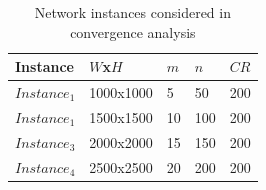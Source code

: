 \begin{table}[!ht]
\begin{center}
\caption{Network instances considered in convergence analysis}
\label{instancesH}
\begin{tabular}{|l|l|l|l|l|}
\hline
\textbf{Instance }& \textbf{$W$x$H$}&\textbf{$m$ }& \textbf{$n$}&\textbf{$CR$}\\\hline
$Instance_1$&1000x1000&5&50&200\\\hline
$Instance_1$&1500x1500&10&100&200\\\hline
$Instance_3$&2000x2000&15&150&200\\\hline
$Instance_4$&2500x2500&20&200&200\\\hline
%
\end{tabular}
\end{center}
\end{table}
